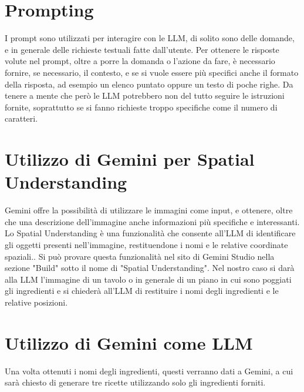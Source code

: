 \section{Prompting}
I prompt sono utilizzati per interagire con le LLM, di solito sono delle domande, e in generale delle richieste testuali fatte dall'utente. Per ottenere le risposte volute nel prompt, oltre a porre la domanda o l'azione da fare, è necessario fornire, se necessario, il contesto, e se si vuole essere più specifici anche il formato della risposta, ad esempio un elenco puntato oppure un testo di poche righe. Da tenere a mente che però le LLM potrebbero non del tutto seguire le istruzioni fornite, soprattutto se si fanno richieste troppo specifiche come il numero di caratteri. \cite{PromptingNvidia} \cite{PromptingGoogle}

\section{Utilizzo di Gemini per Spatial Understanding}
Gemini offre la possibilità di utilizzare le immagini come input, e ottenere, oltre che una descrizione dell'immagine anche informazioni più specifiche e interessanti. Lo Spatial Understanding è una funzionalità che consente all'LLM di identificare gli oggetti presenti nell'immagine, restituendone i nomi e le relative coordinate spaziali.. Si può provare questa funzionalità nel sito di Gemini Studio nella sezione "Build" sotto il nome di "Spatial Understanding". Nel nostro caso si darà alla LLM l'immagine di un tavolo o in generale di un piano in cui sono poggiati gli ingredienti e si chiederà all'LLM di restituire i nomi degli ingredienti e le relative posizioni.
\section{Utilizzo di Gemini come LLM}
Una volta ottenuti i nomi degli ingredienti, questi verranno dati a Gemini, a cui sarà chiesto di generare tre ricette utilizzando solo gli ingredienti forniti.

